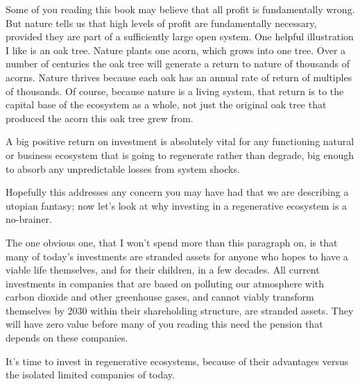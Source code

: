 Some of you reading this book may believe that all profit is fundamentally wrong. But nature tells us that high levels of profit are fundamentally necessary, provided they are part of a sufficiently large open system. One helpful illustration I like is an oak tree. Nature plants one acorn, which grows into one tree. Over a number of centuries the oak tree will generate a return to nature of thousands of acorns. Nature thrives because each oak has an annual rate of return of multiples of thousands. Of course, because nature is a living system, that return is to the capital base of the ecosystem as a whole, not just the original oak tree that produced the acorn this oak tree grew from. 


A big positive return on investment is absolutely vital for any functioning natural or business ecosystem that is going to regenerate rather than degrade, big enough to absorb any unpredictable losses from system shocks.


Hopefully this addresses any concern you may have had that we are describing a utopian fantasy; now let's look at why investing in a regenerative ecosystem is a no-brainer.


The one obvious one, that I won't spend more than this paragraph on, is that many of today's investments are stranded assets for anyone who hopes to have a viable life themselves, and for their children, in a few decades. All current investments in companies that are based on polluting our atmosphere with carbon dioxide and other greenhouse gases, and cannot viably transform themselves by 2030 within their shareholding structure, are stranded assets. They will have zero value before many of you reading this need the pension that depends on these companies.


It's time to invest in regenerative ecosystems, because of their advantages versus the isolated limited companies of today.


